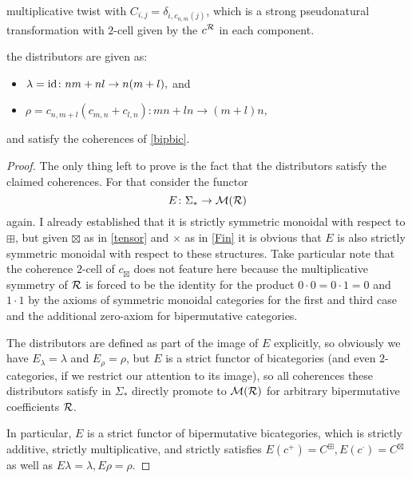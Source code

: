 {{\begin{itemize}
multiplicative twist with $C_{i,j}=\delta_{i,c_{n,m}(j)}$, which is 
a strong pseudonatural transformation with $2$-cell given by the 
$c^{\mathcal{R}}$ in each component.\end{itemize} the distributors are given as:
\begin{itemize} \item $\lambda = \operatorname{id}\colon nm+nl \rightarrow n(m+l),$
and \item $\rho = c_{n,m+l}(c_{m,n}+c_{l,n})\colon mn+ln \rightarrow 
(m+l)n,$\end{itemize} and satisfy the coherences of \ref{bipbic}.
\begin{proof} The only thing left to prove is the fact that the 
distributors satisfy the claimed coherences. For that consider the 
functor \[E\colon \Sigma_*\rightarrow \mathcal{M}(\mathcal{R})\] again. I already 
established that it is strictly symmetric monoidal with respect to $\boxplus$,
but given $\boxtimes$ as in \ref{tensor} and $\times$ as in \ref{Fin}
it is obvious that $E$ is also strictly symmetric monoidal with respect to 
these structures. Take particular note that the coherence $2$-cell of
$c_\boxtimes$ does not feature here because the multiplicative 
symmetry of $\mathcal{R}$ is forced to be the identity for the product 
$0\cdot 0 = 0\cdot 1=0$ and $1\cdot 1$ by the axioms of symmetric 
monoidal categories for the first and third case and the additional 
zero-axiom for bipermutative categories.

The distributors are defined as part of the image of $E$ explicitly,
so obviously we have $E_\lambda = \lambda$ and $E_\rho=\rho$, but $E$
is a strict functor of bicategories (and even $2$-categories, if we
restrict our attention to its image), so all coherences these 
distributors satisfy in $\Sigma_*$ directly promote to $\mathcal{M}(\mathcal{R})$ for 
arbitrary bipermutative coefficients $\mathcal{R}$. 

In particular, $E$ is a strict functor of bipermutative bicategories, 
which is strictly additive, strictly multiplicative, and strictly
satisfies $E(c^+)=C^\boxplus, E(c^\cdot)=C^\boxtimes$ as well as
$E\lambda=\lambda, E\rho=\rho$.\end{proof}}}

{}

